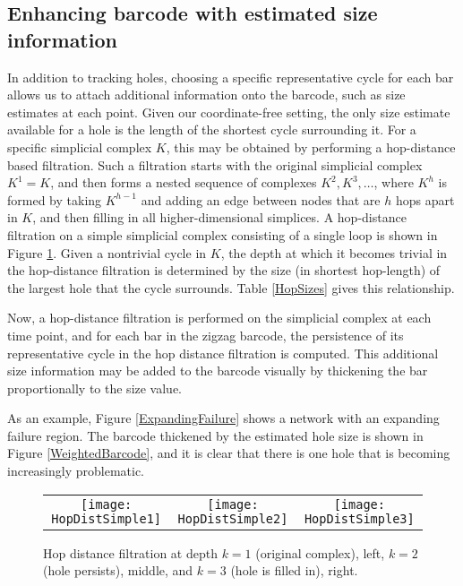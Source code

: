 \documentclass[12pt]{article}
\begin{document}
\subsection{Enhancing barcode with estimated size information}

In addition to tracking holes, choosing a specific representative cycle for each bar allows us to attach additional information onto the barcode, such as size estimates at each point. Given our coordinate-free setting, the only size estimate available for a hole is the length of the shortest cycle surrounding it. For a specific simplicial complex $K$, this may be obtained by performing a hop-distance based filtration. Such a filtration starts with the original simplicial complex $K^1 = K$, and then forms a nested sequence of complexes $K^2, K^3, \ldots$, where $K^h$ is formed by taking $K^{h-1}$ and adding an edge between nodes that are $h$ hops apart in $K$, and then filling in all higher-dimensional simplices. A hop-distance filtration on a simple simplicial complex consisting of a single loop is shown in Figure \ref{HopFilt}. Given a nontrivial cycle in $K$, the depth at which it becomes trivial in the hop-distance filtration is determined by the size (in shortest hop-length) of the largest hole that the cycle surrounds. Table \ref{HopSizes} gives this relationship.

Now, a hop-distance filtration is performed on the simplicial complex at each time point, and for each bar in the zigzag barcode, the persistence of its representative cycle in the hop distance filtration is computed. This additional size information may be added to the barcode visually by thickening the bar proportionally to the size value.

As an example, Figure \ref{ExpandingFailure} shows a network with an expanding failure region. The barcode thickened by the estimated hole size is shown in Figure \ref{WeightedBarcode}, and it is clear that there is one hole that is becoming increasingly problematic.


\begin{figure}[htp]
\begin{center}
\begin{tabular}{ccc}
\texttt{[image: HopDistSimple1]} & \texttt{[image: HopDistSimple2]} & \texttt{[image: HopDistSimple3]} \\
\end{tabular}
\end{center}
\caption{Hop distance filtration at depth $k=1$ (original complex), left, $k=2$ (hole persists), middle, and $k=3$ (hole is filled in), right. \label{HopFilt}}
\end{figure}
\end{document}
